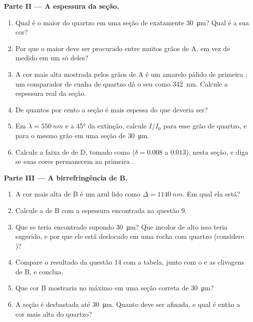 \begin{problem}
\medskip
\noindent\textbf{Parte II --- A espessura da seção.}
\begin{enumerate}[resume]
  \item Qual é o maior  do quartzo em uma seção de exatamente \qty{30}{\micro m}? Qual é a sua cor?
  \item Por que o maior  deve ser procurado entre muitos grãos de A, em vez de medido em um só deles?
  \item A cor mais alta mostrada pelos grãos de A é um amarelo pálido de primeira ; um comparador de cunha de quartzo dá o seu  como \qty{342}{nm}. Calcule a espessura real da seção.
  \item De quantos por cento a seção é mais espessa do que deveria ser?
  \item Em $\lambda = \qty{550}{nm}$ e a \ang{45} da extinção, calcule $I/I_0$ para esse grão de quartzo, e para o mesmo grão em uma seção de \qty{30}{\micro m}.
  \item Calcule a faixa de  de D, tomado como  ($\delta = 0.008$ a $0.013$), nesta seção, e diga se suas cores permanecem na primeira .
\end{enumerate}

\medskip
\noindent\textbf{Parte III --- A birrefringência de B.}
\begin{enumerate}[resume]
  \item A cor mais alta de B é um azul lido como $\Delta = \qty{1140}{nm}$. Em qual  ela está?
  \item Calcule a  de B com a espessura encontrada na questão 9.
  \item Que  se teria encontrado supondo \qty{30}{\micro m}? Que  incolor de  alto isso teria sugerido, e por que ele está deslocado em uma rocha com quartzo (considere )?
  \item Compare o resultado da questão 14 com a tabela, junto com o  e as clivagens de B, e conclua.
  \item Que cor B mostraria no máximo em uma seção correta de \qty{30}{\micro m}?
  \item A seção é desbastada até \qty{30}{\micro m}. Quanto deve ser afinada, e qual é então a cor mais alta do quartzo?
\end{enumerate}


\end{problem}

